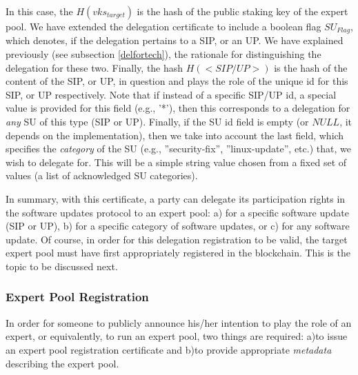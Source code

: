 In this case, the $H(vks_{target})$ is the hash of the public staking key of the expert pool. We have extended the delegation certificate to include a boolean flag $SU_{Flag}$, which denotes, if the delegation pertains to a SIP, or an UP. We have explained previously (see subsection \ref{delfortech}), the rationale for distinguishing the delegation for these two. Finally, the hash $H(<SIP/UP>)$ is the hash of the content of the SIP, or UP, in question and plays the role of the unique id for this SIP, or UP respectively. Note that if instead of a specific SIP/UP id, a special value is provided for this field (e.g., '*'), then this corresponds to a delegation for \emph{any} SU of this type (SIP or UP). Finally, if the SU id field is empty (or $NULL$, it depends on the implementation), then we take into account the last field, which specifies the \emph{category} of the SU (e.g., ''security-fix'', ''linux-update'', etc.) that, we wish to delegate for. This will be a simple string value chosen from a fixed set of values (a list of acknowledged SU categories). 

In summary, with this certificate, a party can delegate its participation rights in the software updates protocol to an expert pool: a) for a specific software update (SIP or UP), b) for a specific category of software updates, or c) for any software update. Of course, in order for this delegation registration to be valid, the target expert pool must have first appropriately registered in the blockchain. This is the topic to be discussed next.

\subsubsection*{Expert Pool Registration}
In order for someone to publicly announce his/her intention to play the role of an expert, or equivalently, to run an expert pool, two things are required: a)to issue an expert pool registration certificate and b)to provide appropriate \emph{metadata} describing the expert pool.


